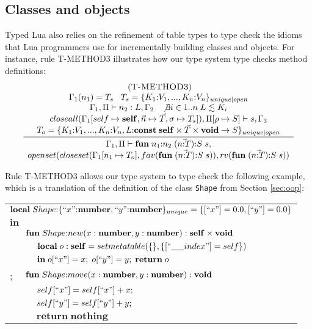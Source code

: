 \subsection{Classes and objects}
\label{sec:cao}

Typed Lua also relies on the refinement of table types to type check
the idioms that Lua programmers use for incrementally building
classes and objects.
For instance, rule \textsc{T-METHOD3} illustrates how our type system
type checks method definitions:
\[
\begin{array}{c}
\; (\textsc{T-METHOD3})\\
\dfrac{\begin{array}{c}
       \Gamma_{1}(n_{1}) = T_{s} \;\;\; T_{s} = \{K_{1}{:}V_{1}, ..., K_{n}{:}V_{n}\}_{unique|open}\\
       \Gamma_{1}, \Pi \vdash n_{2} : L, \Gamma_{2} \;\;\;
       \not \exists i \in 1..n \; L \lesssim K_{i}\\
       closeall(\Gamma_{1}[self \mapsto \mathbf{self}, \vec{n} \mapsto \vec{T}, \sigma \mapsto T_{s}]),
       \Pi[\rho \mapsto S] \vdash s, \Gamma_{3}\\
       T_{o} = \{K_{1}{:}V_{1}, ..., K_{n}{:}V_{n}, L{:}\mathbf{const} \; \mathbf{self} \times \vec{T} \times \mathbf{void} \rightarrow S\}_{unique|open}
       \end{array}}
      {\begin{array}{c}
       \Gamma_{1}, \Pi \vdash \mathbf{fun} \; n_{1}{:}n_{2} \; (\vec{n{:}T}){:}S \; s,\\
       openset(closeset(\Gamma_{1}[n_{1} \mapsto T_{o}], fav(\mathbf{fun} \; (\vec{n{:}T}){:}S \; s)),rv(\mathbf{fun} \; (\vec{n{:}T}){:}S \; s))
       \end{array}}
\end{array}
\]

Rule \textsc{T-METHOD3} allows our type system to type check the
following example, which is a translation of the definition of the class
\texttt{Shape} from Section \ref{sec:oop}:
\begin{center}
\begin{tabular}{llll}
\multicolumn{4}{l}{$\mathbf{local} \; Shape{:}\{``x"{:}\mathbf{number}, ``y"{:}\mathbf{number}\}_{unique} = \{ [``x"] = 0.0, [``y"] = 0.0 \}$}\\
\multicolumn{4}{l}{$\mathbf{in}$}\\
& \multicolumn{3}{l}{$\mathbf{fun} \; Shape{:}new (x:\mathbf{number}, y:\mathbf{number}):\mathbf{self} \times \mathbf{void}$}\\
& & \multicolumn{2}{l}{$\mathbf{local} \; o:\Self = setmetatable(\{\}, \{ [``\string_\string_index"] = self \})$}\\
& & \multicolumn{2}{l}{$\mathbf{in} \; o[``x"] = x; \; o[``y"] = y; \; \mathbf{return} \; o$}\\
; & \multicolumn{3}{l}{$\mathbf{fun} \; Shape{:}move (x:\mathbf{number}, y:\mathbf{number}):\mathbf{void}$}\\
& & \multicolumn{2}{l}{$self[``x"] = self[``x"] + x;$}\\
& & \multicolumn{2}{l}{$self[``y"] = self[``y"] + y;$}\\
& & \multicolumn{2}{l}{$\mathbf{return} \; \mathbf{nothing}$}
\end{tabular}
\end{center}

